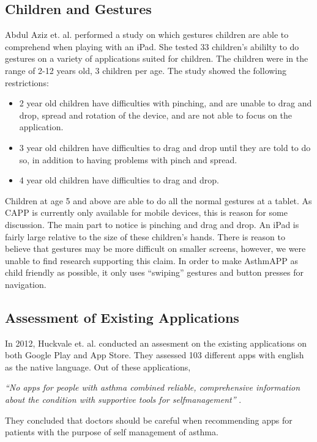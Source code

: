 \subsection{Children and Gestures}

Abdul Aziz et. al. \cite{aziz2013children} performed a study on which gestures children are able to comprehend when playing with an iPad. She tested 33 children's abililty to do gestures on a variety of applications suited for children. The children were in the range of 2-12 years old, 3 children per age. The study showed the following restrictions:

\begin{itemize}
  \item 2 year old children have difficulties with pinching, and are unable to drag and drop, spread and rotation of the device, and are not able to focus on the application. 
  \item 3 year old children have difficulties to drag and drop until they are told to do so, in addition to having problems with pinch and spread. 
  \item 4 year old children have difficulties to drag and drop. 
\end{itemize}
Children at age 5 and above are able to do all the normal gestures at a tablet. As CAPP is currently only available for mobile devices, this is reason for some discussion. The main part to notice is pinching and drag and drop. An iPad is fairly large relative to the size of these children's hands. There is reason to believe that gestures may be more difficult on smaller screens, however, we were unable to find research supporting this claim. In order to make AsthmAPP as child friendly as possible, it only uses ``swiping'' gestures and button presses for navigation.

\subsection{Assessment of Existing Applications}
In 2012, Huckvale et. al. \cite{huckvale2012apps} conducted an assesment on the existing applications on both Google Play and App Store. They assessed 103 different apps with english as the native language. Out of these applications, 


\emph{``No apps for people with asthma combined reliable, comprehensive information about the condition with supportive tools for self­management''} \cite{huckvale2012apps}. 


They concluded that doctors should be careful when recommending apps for patients with the purpose of self management of asthma.